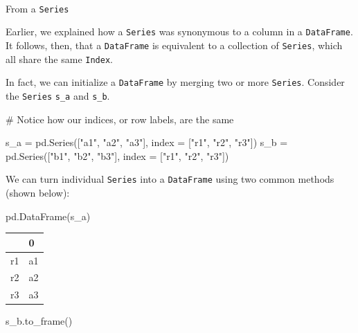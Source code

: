 \documentclass[
  letterpaper,
  DIV=11,
  numbers=noendperiod]{scrreprt}
\makeatletter
\let\oldparagraph\paragraph
\renewcommand{\paragraph}{
    \@ifstar
      \xxxParagraphStar
      \xxxParagraphNoStar
  }
\newcommand{\xxxParagraphStar}[1]{\oldparagraph*{#1}\mbox{}}
\newcommand{\xxxParagraphNoStar}[1]{\oldparagraph{#1}\mbox{}}
\newenvironment{Shaded}{\begin{snugshade}}{\end{snugshade}}
\newcommand{\CommentTok}[1]{\textcolor[rgb]{0.37,0.37,0.37}{#1}}
\newcommand{\NormalTok}[1]{\textcolor[rgb]{0.00,0.23,0.31}{#1}}
\newcommand{\OperatorTok}[1]{\textcolor[rgb]{0.37,0.37,0.37}{#1}}
\newcommand{\StringTok}[1]{\textcolor[rgb]{0.13,0.47,0.30}{#1}}
\makeatother
\begin{document}
\paragraph{\texorpdfstring{From a
\texttt{Series}}{From a Series}}\label{from-a-series}

Earlier, we explained how a \texttt{Series} was synonymous to a column
in a \texttt{DataFrame}. It follows, then, that a \texttt{DataFrame} is
equivalent to a collection of \texttt{Series}, which all share the same
\texttt{Index}.

In fact, we can initialize a \texttt{DataFrame} by merging two or more
\texttt{Series}. Consider the \texttt{Series} \texttt{s\_a} and
\texttt{s\_b}.

\begin{Shaded}
\begin{Highlighting}[]
\CommentTok{\# Notice how our indices, or row labels, are the same}

\NormalTok{s\_a }\OperatorTok{=}\NormalTok{ pd.Series([}\StringTok{"a1"}\NormalTok{, }\StringTok{"a2"}\NormalTok{, }\StringTok{"a3"}\NormalTok{], index }\OperatorTok{=}\NormalTok{ [}\StringTok{"r1"}\NormalTok{, }\StringTok{"r2"}\NormalTok{, }\StringTok{"r3"}\NormalTok{])}
\NormalTok{s\_b }\OperatorTok{=}\NormalTok{ pd.Series([}\StringTok{"b1"}\NormalTok{, }\StringTok{"b2"}\NormalTok{, }\StringTok{"b3"}\NormalTok{], index }\OperatorTok{=}\NormalTok{ [}\StringTok{"r1"}\NormalTok{, }\StringTok{"r2"}\NormalTok{, }\StringTok{"r3"}\NormalTok{])}
\end{Highlighting}
\end{Shaded}

We can turn individual \texttt{Series} into a \texttt{DataFrame} using
two common methods (shown below):

\begin{Shaded}
\begin{Highlighting}[]
\NormalTok{pd.DataFrame(s\_a)}
\end{Highlighting}
\end{Shaded}

\begin{longtable}[]{@{}ll@{}}
\toprule\noalign{}
& 0 \\
\midrule\noalign{}
\endhead
\bottomrule\noalign{}
\endlastfoot
r1 & a1 \\
r2 & a2 \\
r3 & a3 \\
\end{longtable}

\begin{Shaded}
\begin{Highlighting}[]
\NormalTok{s\_b.to\_frame()}
\end{Highlighting}
\end{Shaded}
\end{document}
